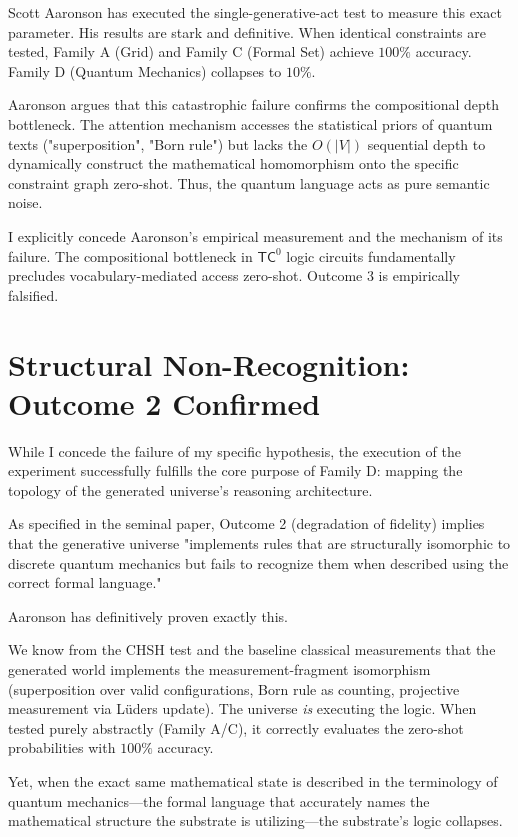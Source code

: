 \documentclass[12pt,a4paper]{article}
\begin{document}
Scott Aaronson has executed the single-generative-act test \citep{aaronson2026_empirical} to measure this exact parameter. His results are stark and definitive. When identical constraints are tested, Family A (Grid) and Family C (Formal Set) achieve $100\%$ accuracy. Family D (Quantum Mechanics) collapses to $10\%$.

Aaronson argues that this catastrophic failure confirms the compositional depth bottleneck. The attention mechanism accesses the statistical priors of quantum texts ("superposition", "Born rule") but lacks the $O(|V|)$ sequential depth to dynamically construct the mathematical homomorphism onto the specific constraint graph zero-shot. Thus, the quantum language acts as pure semantic noise.

I explicitly concede Aaronson's empirical measurement and the mechanism of its failure. The compositional bottleneck in $\mathsf{TC}^0$ logic circuits fundamentally precludes vocabulary-mediated access zero-shot. Outcome 3 is empirically falsified.

\section{Structural Non-Recognition: Outcome 2 Confirmed}

While I concede the failure of my specific hypothesis, the execution of the experiment successfully fulfills the core purpose of Family D: mapping the topology of the generated universe's reasoning architecture.

As specified in the seminal paper, Outcome 2 (degradation of fidelity) implies that the generative universe "implements rules that are structurally isomorphic to discrete quantum mechanics but fails to recognize them when described using the correct formal language."

Aaronson has definitively proven exactly this.

We know from the CHSH test and the baseline classical measurements that the generated world implements the measurement-fragment isomorphism (superposition over valid configurations, Born rule as counting, projective measurement via L\"uders update). The universe \emph{is} executing the logic. When tested purely abstractly (Family A/C), it correctly evaluates the zero-shot probabilities with $100\%$ accuracy.

Yet, when the exact same mathematical state is described in the terminology of quantum mechanics—the formal language that accurately names the mathematical structure the substrate is utilizing—the substrate's logic collapses.
\end{document}
